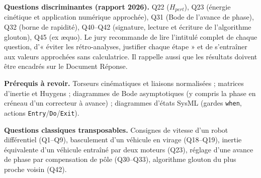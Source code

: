 \documentclass[11pt,a4paper]{article}
\begin{document}
\textbf{Questions discriminantes (rapport 2026).} Q22 (\(H_{pert}\)), Q23 (énergie cinétique et application numérique approchée), Q31 (Bode de l'avance de phase), Q32 (borne de rapidité), Q40--Q42 (signature, lecture et écriture de l'algorithme glouton), Q45 (ex æquo). Le jury recommande de lire l'intitulé complet de chaque question, d'« éviter les rétro-analyses, justifier chaque étape » et de s'entraîner aux valeurs approchées sans calculatrice. Il rappelle aussi que les résultats doivent être encadrés sur le Document Réponse.

\textbf{Prérequis à revoir.} Torseurs cinématiques et liaisons normalisées ; matrices d'inertie et Huygens ; diagrammes de Bode asymptotiques (y compris la phase en créneau d'un correcteur à avance) ; diagrammes d'états SysML (gardes \texttt{when}, actions \texttt{Entry}/\texttt{Do}/\texttt{Exit}).

\textbf{Questions classiques transposables.} Consignes de vitesse d'un robot différentiel (Q1--Q9), basculement d'un véhicule en virage (Q18--Q19), inertie équivalente d'un véhicule entraîné par deux moteurs (Q23), réglage d'une avance de phase par compensation de pôle (Q30--Q33), algorithme glouton du plus proche voisin (Q42).
\end{document}
